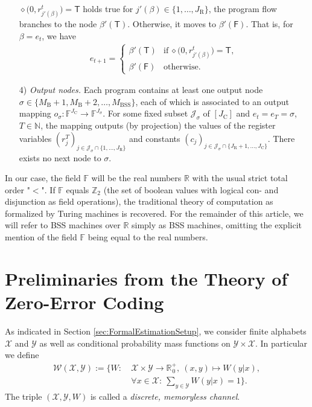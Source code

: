 \documentclass[conference]{IEEEtran}
\def\X{{\mathcal X}}
\def\Y{{\mathcal Y}}
\def\J{{\mathcal J}}
\def\W{{\mathcal W}}
\def\NN{{\mathbb N}}
\def\RR{{\mathbb R}}
\def\ZZ{{\mathbb Z}}
\def\FF{{\mathbb F}}
\newcommand{\BSS}{\mathrm{BSS}}
\begin{document}
\begin{itemize}
						\(	\diamond\big(0, r^t_{j'(\beta)}\big) = \mathsf{T} 
						\)
						holds true for \(j'(\beta) \in \{1,\ldots, J_\mathrm{R}\}\), the program flow branches to the node \(\beta'(\mathsf{T})\). Otherwise, it moves to \(\beta'(\mathsf{F})\). 
						That is, for \(\beta = e_t\), we have
						\begin{align*}   e_{t+1} =   \begin{cases}   \beta'(\mathsf{T})  &\text{if}~\diamond\big(0,r^t_{j'(\beta)}\big) = \mathsf{T},\\
																	\beta'(\mathsf{F})  &\text{otherwise}.
													\end{cases}    
						\end{align*}
					\item[4)] \emph{Output nodes.} Each program contains at least one output node \(\sigma \in \{M_{\mathrm{B}} + 1, M_{\mathrm{B}} + 2,\ldots, M_\BSS\}\), 
						each of which is associated to an output mapping
						\(	o_\sigma : \FF^{J_{\mathrm{C}}}\rightarrow \FF^{J_{\sigma}}.
						\)
						For some fixed subset \(\J_\sigma\) of \([J_\mathrm{C}]\) and \(e_t = e_T = \sigma\), \(T\in\NN\), the mapping outputs (by projection) the values of the 
						register variables \((r_j^T)_{j\in \J_\sigma \cap \{1,\ldots,J_\mathrm{R}\}}\) and constants \((c_j)_{j\in \J_\sigma \cap \{J_\mathrm{R}+1,\ldots,J_\mathrm{C}\}}\). 
						There exists no next node to \(\sigma\).
	\end{itemize}
	In our case, the field \(\FF\) will be the real numbers \(\RR\) with the usual strict total order "\(<\)". If \(\FF\) equals \(\ZZ_2\) (the set of boolean values with logical con- and disjunction 
	as field operations), the traditional theory of computation as formalized by Turing machines is recovered. For the remainder of this article, we will refer to BSS machines over \(\RR\) 
	simply as BSS machines, omitting the explicit mention of the field \(\FF\) being equal to the real numbers. 

\section{Preliminaries from the Theory of Zero-Error Coding}	\label{sec:PreliminariesZeroError}
	\noindent As indicated in Section \ref{sec:FormalEstimationSetup}, we consider finite alphabets \(\X\) and \(\Y\) as well as conditional probability mass functions on \(\Y\times\X\).
	In particular we define
	\begin{align*}	\W(\X,\Y)	:=	\bigg\{ W: 	&~\X \times \Y \rightarrow\RR_{\hspace{1pt}0}^+,~ (x,y) \mapsto W(y|x),\\
												&~\forall x\in\X: ~{\sum}_{y\in\Y} W(y|x) = 1 \bigg\}.
	\end{align*}
	The triple \((\X,\Y,W)\) is called a \emph{discrete, memoryless channel}. 
\end{document}

